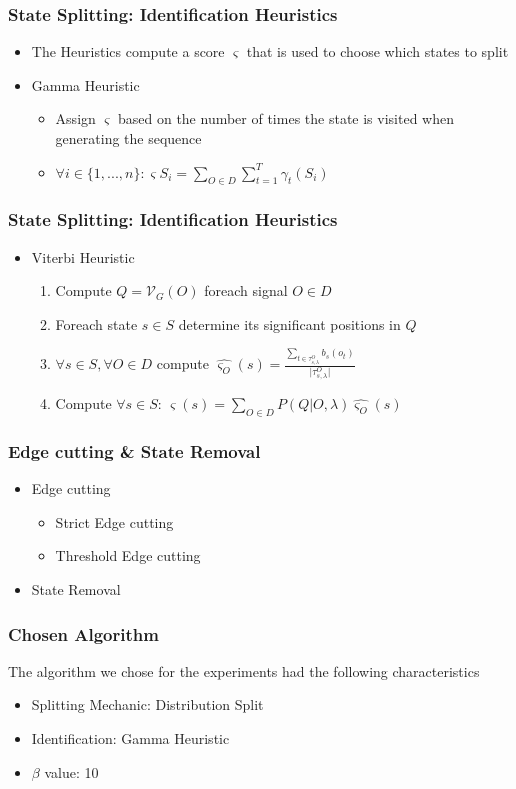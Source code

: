 \begin{frame}
  \frametitle{State Splitting: Identification Heuristics} 
  \begin{itemize}
  	\item The Heuristics compute a score $\varsigma$ that is used to choose which states to split
  	\item Gamma Heuristic
	\begin{itemize}
		\item Assign $\varsigma$ based on the number of times the state is visited when generating the sequence
		\item $\forall i \in \{1, ...,n\}: \varsigma S_i = \sum_{O \in D} \sum_{t=1}^T \gamma_t(S_i)$
	\end{itemize}
  \end{itemize}
  
\end{frame}


\begin{frame}
  \frametitle{State Splitting: Identification Heuristics} 
  \begin{itemize}
  	\item Viterbi Heuristic
  	\begin{enumerate}
  		\item Compute $Q = \mathcal{V}_G(O)$ foreach signal $O \in D$
  		\item Foreach state $s \in S$ determine its significant positions in $Q$ 
  		\item $\forall s \in S, \forall O \in D $ compute $\hat{\varsigma_O}(s) = \frac{\sum_{t \in \tau_{s,\lambda}^O} b_s(o_t)}{\vert \tau_{s,\lambda}^O \vert}$
  		\item Compute $\forall s \in S$: $\varsigma (s) = \sum_{O \in D} P(Q \vert O, \lambda) \hat{\varsigma_O}(s)$
  	\end{enumerate}
  \end{itemize}
  
\end{frame}

\begin{frame}
  \frametitle{Edge cutting \& State Removal} 

	\begin{itemize}
		\item Edge cutting
			\begin{itemize}
				\item Strict Edge cutting
				\item Threshold Edge cutting
			\end{itemize}
		\item State Removal
	\end{itemize}

\end{frame}


\begin{frame}
  \frametitle{Chosen Algorithm} 
	
	The algorithm we chose for the experiments had the following characteristics
	\begin{itemize}
		\item Splitting Mechanic: Distribution Split
		\item Identification: Gamma Heuristic
		\item $\beta$ value: 10
	\end{itemize}

\end{frame}







